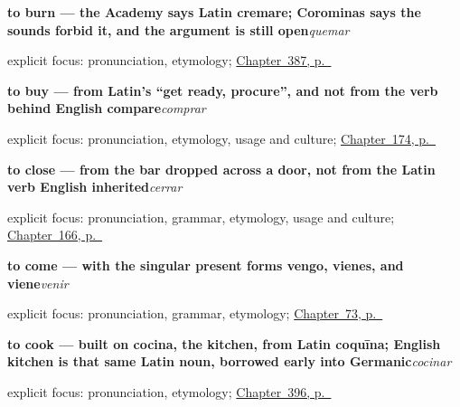 \noindent\begin{minipage}[t]{\linewidth}
\raggedright
\textbf{to burn — the Academy says Latin cremare; Corominas says the sounds forbid it, and the argument is still open}\enspace\emph{quemar}\par
\footnotesize explicit focus: pronunciation, etymology; \hyperref[ch:quemar-y-cruzar]{Chapter~387, p.~\pageref*{ch:quemar-y-cruzar}}
\end{minipage}\par\smallskip

\noindent\begin{minipage}[t]{\linewidth}
\raggedright
\textbf{to buy — from Latin's \textquotedblleft{}get ready, procure\textquotedblright{}, and not from the verb behind English compare}\enspace\emph{comprar}\par
\footnotesize explicit focus: pronunciation, etymology, usage and culture; \hyperref[ch:spanish-wait-answer-buy]{Chapter~174, p.~\pageref*{ch:spanish-wait-answer-buy}}
\end{minipage}\par\smallskip

\noindent\begin{minipage}[t]{\linewidth}
\raggedright
\textbf{to close — from the bar dropped across a door, not from the Latin verb English inherited}\enspace\emph{cerrar}\par
\footnotesize explicit focus: pronunciation, grammar, etymology, usage and culture; \hyperref[ch:spanish-open-close-sit-stand]{Chapter~166, p.~\pageref*{ch:spanish-open-close-sit-stand}}
\end{minipage}\par\smallskip

\noindent\begin{minipage}[t]{\linewidth}
\raggedright
\textbf{to come — with the singular present forms vengo, vienes, and viene}\enspace\emph{venir}\par
\footnotesize explicit focus: pronunciation, grammar, etymology; \hyperref[ch:spanish-venir]{Chapter~73, p.~\pageref*{ch:spanish-venir}}
\end{minipage}\par\smallskip

\noindent\begin{minipage}[t]{\linewidth}
\raggedright
\textbf{to cook — built on cocina, the kitchen, from Latin coquīna; English kitchen is that same Latin noun, borrowed early into Germanic}\enspace\emph{cocinar}\par
\footnotesize explicit focus: pronunciation, etymology; \hyperref[ch:aprender-y-cocinar]{Chapter~396, p.~\pageref*{ch:aprender-y-cocinar}}
\end{minipage}\par\smallskip

